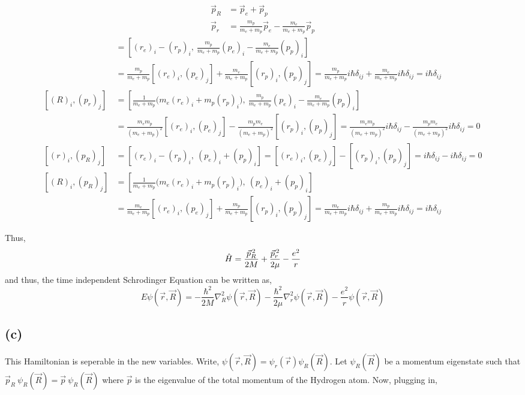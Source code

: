 \documentclass[12pt]{extarticle}
\begin{document}
\begin{align*}
\vec{p}_R & = \vec{p}_e + \vec{p}_p \\
\vec{p}_r & = \frac{m_p}{m_e + m_p} \vec{p}_e  - \frac{m_e}{m_e + m_p} \vec{p}_p
\end{align*}
\begin{align*}
[(r)_i, (p_r)_j] &= \left[(r_e)_i - (r_p)_i, \: \frac{m_p}{m_e + m_p} (p_e)_i - \frac{m_e}{m_e + m_p} (p_p)_i \right] \\ & =  \frac{m_p}{m_e + m_p} [(r_e)_i, (p_e)_j] + \frac{m_e}{m_e + m_p} [(r_p)_i, (p_p)_j] = \frac{m_p}{m_e + m_p} i \hbar \delta_{ij} + \frac{m_e}{m_e + m_p} i \hbar \delta_{ij} = i \hbar \delta_{ij} \\
[(R)_i, (p_r)_j] &= \left[\frac{1}{m_e + m_p} \big( m_e (r_e)_i + m_p (r_p)_i \big), \: \frac{m_p}{m_e + m_p} (p_e)_i - \frac{m_e}{m_e + m_p} (p_p)_i \right] \\ & =  \frac{m_e m_p}{(m_e + m_p)^2} [(r_e)_i, (p_e)_j] - \frac{m_p m_e}{(m_e + m_p)^2} [(r_p)_i, (p_p)_j] = \frac{m_e m_p}{(m_e + m_p)^2} i \hbar \delta_{ij} - \frac{m_p m_e}{(m_e + m_p)^2} i \hbar \delta_{ij} = 0 \\
[(r)_i, (p_R)_j] &= \left[(r_e)_i - (r_p)_i, \: (p_e)_i + (p_p)_i \right] =  [(r_e)_i, (p_e)_j] - [(r_p)_i, (p_p)_j] = i \hbar \delta_{ij} - i \hbar \delta_{ij} = 0 \\
[(R)_i, (p_R)_j] &= \left[\frac{1}{m_e + m_p} \big( m_e (r_e)_i + m_p (r_p)_i \big), \: (p_e)_i + (p_p)_i \right] \\ & = \frac{m_e}{m_e + m_p} [(r_e)_i, (p_e)_j] + \frac{m_p}{m_e + m_p} [(r_p)_i, (p_p)_j] = \frac{m_e}{m_e + m_p} i \hbar \delta_{ij} + \frac{m_p}{m_e + m_p} i \hbar \delta_{ij} = i \hbar \delta_{ij} 
\end{align*} 

Thus,
\[\hat{H} = \frac{\vec{p}_R^{\,2}}{2 M} + \frac{\vec{p}_r^{\, 2}}{2\mu} - \frac{e^2}{r}\]
and thus, the time independent Schrodinger Equation can be written as,
\[ E \psi(\vec{r}, \vec{R}) = - \frac{\hbar^2}{2 M} \nabla_R^2 \psi(\vec{r}, \vec{R}) - \frac{\hbar^2}{2 \mu} \nabla_r^2 \psi(\vec{r}, \vec{R}) - \frac{e^2}{r} \psi(\vec{r}, \vec{R})\]
\subsection*{(c)}

This Hamiltonian is seperable in the new variables. Write, $\psi(\vec{r}, \vec{R}) = \psi_r(\vec{r}) \psi_R(\vec{R})$. Let $\psi_R(\vec{R})$ be a momentum eigenstate such that $\vec{p}_R \: \psi_R(\vec{R}) = \vec{p} \: \psi_R(\vec{R})$ where $\vec{p}$ is the eigenvalue of the total momentum of the Hydrogen atom. Now, plugging in, 
\end{document}
